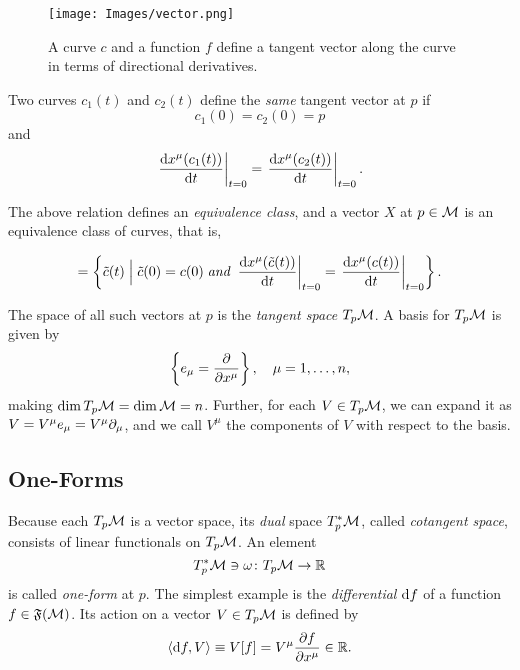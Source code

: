 \begin{figure}
	\centering
	\texttt{[image: Images/vector.png]}
	\caption{A curve $c$ and a function $f$ define a tangent vector along the curve in terms of directional derivatives.}
	\label{fig:vector}
\end{figure}

Two curves $c_1(t)$ and $c_2(t)$ define the \emph{same} tangent vector at $p$ if
\begin{equation}
	c_1(0)= c_2(0)=p
\end{equation}
and
\begin{equation}
	\left. \frac{\mathop{}\!\mathrm{d} x^\mu(c_1(t))}{\mathop{}\!\mathrm{d} t} \right|_{t=0} = \left. \frac{\mathop{}\!\mathrm{d} x^\mu(c_2(t))}{\mathop{}\!\mathrm{d} t} \right|_{t=0} .
\end{equation}

The above relation defines an \emph{equivalence class}, and a vector $X$ at $p\in\mathcal{M}$ is an equivalence class of curves, that is,

\begin{equation}
	[c(t)] = \left\{ \tilde{c}(t) \; \Big| \; \tilde{c}(0) = c(0) \; \textit{and} \; \left. \frac{\ud x^\mu (\tilde{c}(t))}{\ud t}\right|_{t=0} = \left. \frac{\ud x^\mu (c(t))}{\ud t}\right|_{t=0} \right\} .
\end{equation}

The space of all such vectors at $p$ is the \emph{tangent space} $T_p \mathcal{M}$. A basis for $T_p \mathcal{M}$ is given by
\begin{equation}
	\left\{ e_\mu = \frac{\partial}{\partial x^\mu} \right\}   , \quad \mu = 1, \dots, n,
\end{equation}
making $\dim T_p \mathcal{M} = \dim \mathcal{M} = n$. Further, for each $V \in T_p \mathcal{M}$, we can expand it as $V = V^\mu e_\mu = V^\mu \partial_\mu$, and we call $V^\mu$ the components of $V$ with respect to the basis.

\subsection{One-Forms}
Because each $T_p \mathcal{M}$ is a vector space, its \emph{dual} space $T^*_p \mathcal{M}$, called \emph{cotangent space}, consists of linear functionals on $T_p \mathcal{M}$. An element 
\begin{equation}
    T^*_p \mathcal{M} \ni \omega \colon T_p \mathcal{M} \to \mathbb{R}
\end{equation}
is called \emph{one-form} at $p$. The simplest example is the \emph{differential} $\mathop{}\!\mathrm{d} f$ of a function $f \in \mathfrak{F}(\mathcal{M})$. Its action on a vector $V \in T_p \mathcal{M}$ is defined by
\begin{equation}
	\langle \mathop{}\!\mathrm{d} f, V \rangle \equiv V[f] = V^\mu \frac{\partial f}{\partial x^\mu} \in \mathbb{R}.
\end{equation}


